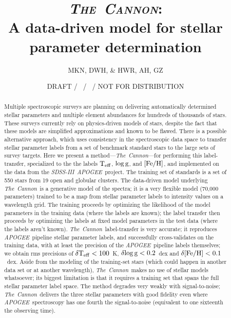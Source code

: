 \documentclass[12pt, preprint]{aastex}
\newcommand{\teff}{\mbox{$\rm T_{eff}$}}
\newcommand{\feh}{\mbox{$\rm [Fe/H]$}}
\newcommand{\logg}{\mbox{$\rm \log g$}}
\newcommand{\tc}{\textsl{The~Cannon}}
\newcommand{\apogee}{\textsl{APOGEE}}
\newcommand{\sdss}{\textsl{SDSS-III}}
\begin{document}
\title{\textsc{\tc:}\\ A data-driven model for stellar parameter determination}
\author{
  MKN,
  DWH,
  \&
  HWR,
  AH, GZ} 
\date{DRAFT / \gitdate\ / \githash\ / NOT FOR DISTRIBUTION}



\begin{abstract}%

Multiple spectroscopic surveys are planning on delivering
automatically determined stellar parameters and multiple element
abundances for hundreds of thousands of stars.
These surveys currently rely on physics-driven models of stars,
despite the fact that these models are simplified approximations and known to be flawed. 
There is a possible alternative approach, which uses consistency in
the spectroscopic data space to transfer stellar parameter labels from
a set of benchmark standard stars to the large sets of survey targets.
Here we present a method---\tc---for performing this label-transfer,
specialized to the the labels \teff, \logg, and \feh, and implemented on 
the data from the \sdss\ \apogee\ project.
The training set of standards is a set of 550 stars from 19
open and globular clusters.
The data-driven model underlying \tc\ is a generative model of the
spectra; it is a very flexible model (70,000 parameters) trained to be
a map from stellar parameter labels to intensity values on a wavelength
grid.
The training proceeds by optimizing the likelihood of the model
parameters in the training data (where the labels are known); the label
transfer then proceeds by optimizing the labels at fixed
model parameters in the test data (where the labels aren't known).
\tc\ label-transfer is very accurate; it reproduces \apogee\ pipeline
stellar parameter labels, and successfully cross-validates on the
training data, with at least the precision of the \apogee\ pipeline
labels themselves; we obtain rms precisions of $\delta\teff< 100$~K,
$\delta\logg< 0.2$~dex and $\delta\feh< 0.1$~dex.
Aside from the modeling of the training-set stars (which could happen
in another data set or at another wavelength), \tc\ makes no use of
stellar models whatsoever; its biggest limitation is that it requires a
training set that spans the full stellar parameter label space.
The method degrades very weakly with signal-to-noise; \tc\ delivers
the three stellar parameters with good fidelity even where
\apogee\ spectroscopy has one fourth the
signal-to-noise (equivalent to one sixteenth the observing time).

\end{abstract}
\end{document}
